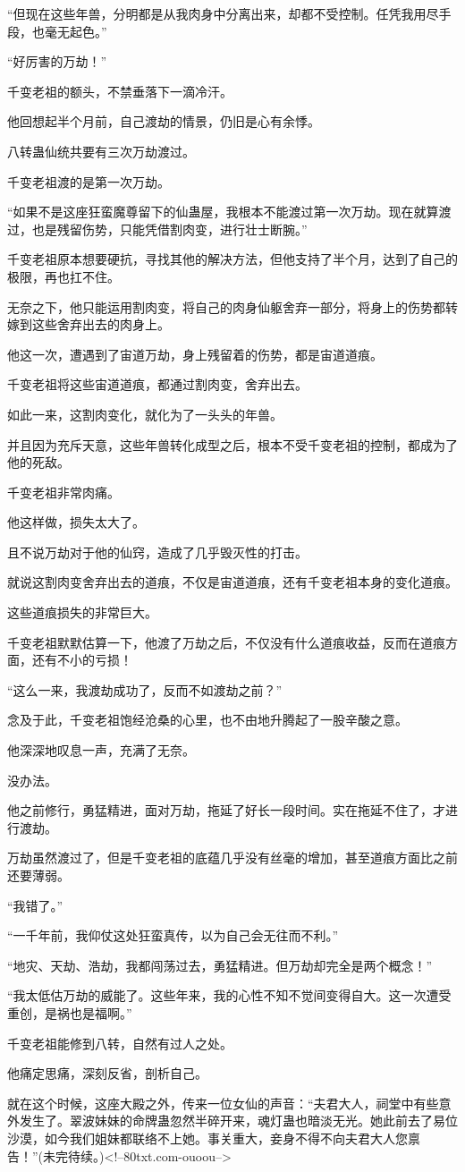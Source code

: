 \begin{this_body}
“但现在这些年兽，分明都是从我肉身中分离出来，却都不受控制。任凭我用尽手段，也毫无起色。”

“好厉害的万劫！”

千变老祖的额头，不禁垂落下一滴冷汗。

他回想起半个月前，自己渡劫的情景，仍旧是心有余悸。

八转蛊仙统共要有三次万劫渡过。

千变老祖渡的是第一次万劫。

“如果不是这座狂蛮魔尊留下的仙蛊屋，我根本不能渡过第一次万劫。现在就算渡过，也是残留伤势，只能凭借割肉变，进行壮士断腕。”

千变老祖原本想要硬抗，寻找其他的解决方法，但他支持了半个月，达到了自己的极限，再也扛不住。

无奈之下，他只能运用割肉变，将自己的肉身仙躯舍弃一部分，将身上的伤势都转嫁到这些舍弃出去的肉身上。

他这一次，遭遇到了宙道万劫，身上残留着的伤势，都是宙道道痕。

千变老祖将这些宙道道痕，都通过割肉变，舍弃出去。

如此一来，这割肉变化，就化为了一头头的年兽。

并且因为充斥天意，这些年兽转化成型之后，根本不受千变老祖的控制，都成为了他的死敌。

千变老祖非常肉痛。

他这样做，损失太大了。

且不说万劫对于他的仙窍，造成了几乎毁灭性的打击。

就说这割肉变舍弃出去的道痕，不仅是宙道道痕，还有千变老祖本身的变化道痕。

这些道痕损失的非常巨大。

千变老祖默默估算一下，他渡了万劫之后，不仅没有什么道痕收益，反而在道痕方面，还有不小的亏损！

“这么一来，我渡劫成功了，反而不如渡劫之前？”

念及于此，千变老祖饱经沧桑的心里，也不由地升腾起了一股辛酸之意。

他深深地叹息一声，充满了无奈。

没办法。

他之前修行，勇猛精进，面对万劫，拖延了好长一段时间。实在拖延不住了，才进行渡劫。

万劫虽然渡过了，但是千变老祖的底蕴几乎没有丝毫的增加，甚至道痕方面比之前还要薄弱。

“我错了。”

“一千年前，我仰仗这处狂蛮真传，以为自己会无往而不利。”

“地灾、天劫、浩劫，我都闯荡过去，勇猛精进。但万劫却完全是两个概念！”

“我太低估万劫的威能了。这些年来，我的心性不知不觉间变得自大。这一次遭受重创，是祸也是福啊。”

千变老祖能修到八转，自然有过人之处。

他痛定思痛，深刻反省，剖析自己。

就在这个时候，这座大殿之外，传来一位女仙的声音：“夫君大人，祠堂中有些意外发生了。翠波妹妹的命牌蛊忽然半碎开来，魂灯蛊也暗淡无光。她此前去了易位沙漠，如今我们姐妹都联络不上她。事关重大，妾身不得不向夫君大人您禀告！”(未完待续。)<!--80txt.com-ouoou-->

\end{this_body}

